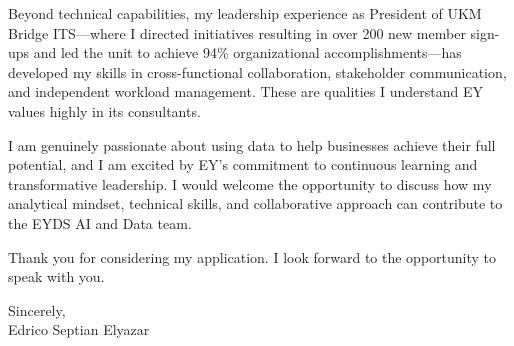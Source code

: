\documentclass[11pt, letterpaper]{article}
\begin{document}
Beyond technical capabilities, my leadership experience as President of UKM Bridge ITS---where I directed initiatives resulting in over 200 new member sign-ups and led the unit to achieve 94\% organizational accomplishments---has developed my skills in cross-functional collaboration, stakeholder communication, and independent workload management. These are qualities I understand EY values highly in its consultants.

I am genuinely passionate about using data to help businesses achieve their full potential, and I am excited by EY's commitment to continuous learning and transformative leadership. I would welcome the opportunity to discuss how my analytical mindset, technical skills, and collaborative approach can contribute to the EYDS AI and Data team.

Thank you for considering my application. I look forward to the opportunity to speak with you.

\vspace{1em}
Sincerely, \\[0.5em]
Edrico Septian Elyazar
\end{document}
